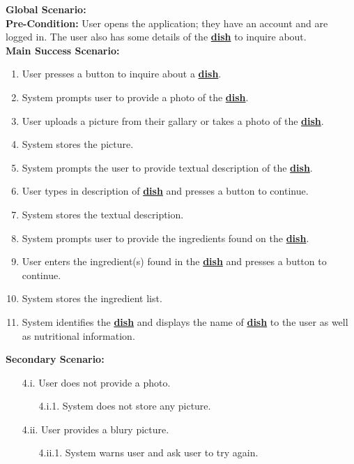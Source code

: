 \documentclass[]{article}
\begin{document}
\begin{enumerate}[{\bf BE1.}]
		{\bf Global Scenario:} \\
		\textbf{Pre-Condition:} User opens the application; they have an account and are logged in. The user also has some details of the \hyperref[Dish]{\textbf{dish}} to inquire about. \\
		\textbf{Main Success Scenario:} 
		\begin{enumerate}[{1.}]
			\item User presses a button to inquire about a \hyperref[Dish]{\textbf{dish}}.
			\item System prompts user to provide a photo of the \hyperref[Dish]{\textbf{dish}}.
			\item User uploads a picture from their gallary or takes a photo of the \hyperref[Dish]{\textbf{dish}}.
			\item System stores the picture.
			\item System prompts the user to provide textual description of the \hyperref[Dish]{\textbf{dish}}.
			\item User types in description of \hyperref[Dish]{\textbf{dish}} and presses a button to continue.
			\item System stores the textual description.
			\item System prompts user to provide the ingredients found on the \hyperref[Dish]{\textbf{dish}}.
			\item User enters the ingredient(s) found in the \hyperref[Dish]{\textbf{dish}} and presses a button to continue.
			\item System stores the ingredient list.
			\item System identifies the \hyperref[Dish]{\textbf{dish}} and displays the name of \hyperref[Dish]{\textbf{dish}} to the user as well as nutritional information.
		\end{enumerate}
		\textbf{Secondary Scenario:}
		\begin{enumerate}
			\item[4.i.] User does not provide a photo.
			\begin{enumerate}
				\item[4.i.1.] System does not store any picture.
			\end{enumerate}
			\item[4.ii.] User provides a blury picture.
			\begin{enumerate}
				\item[4.ii.1.] System warns user and ask user to try again.
			\end{enumerate}
		\end{enumerate}

\end{enumerate}
\end{document}
